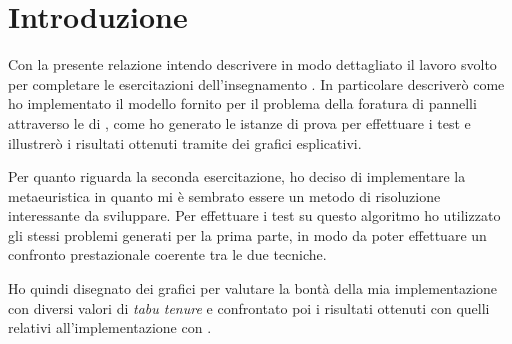 \section{Introduzione}
Con la presente relazione intendo descrivere in modo dettagliato il lavoro svolto per completare le esercitazioni dell'insegnamento \memoclong. In particolare descriverò come ho implementato il modello fornito per il problema della foratura di pannelli attraverso le  di , come ho generato le istanze di prova per effettuare i test e illustrerò i risultati ottenuti tramite dei grafici esplicativi.

Per quanto riguarda la seconda esercitazione, ho deciso di implementare la metaeuristica \tabu in quanto mi è sembrato essere un metodo di risoluzione interessante da sviluppare. Per effettuare i test su questo algoritmo ho utilizzato gli stessi problemi generati per la prima parte, in modo da poter effettuare un confronto prestazionale coerente tra le due tecniche.

Ho quindi disegnato dei grafici per valutare la bontà della mia implementazione con diversi valori di \emph{tabu tenure} e confrontato poi i risultati ottenuti con quelli relativi all'implementazione con .